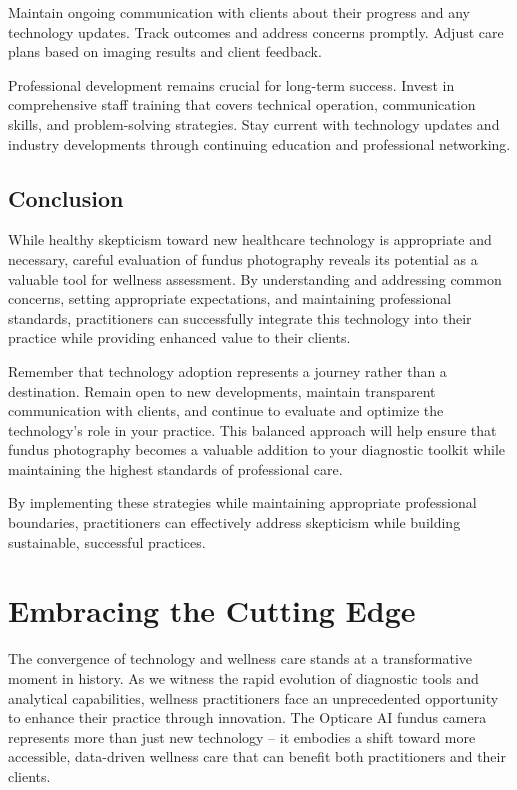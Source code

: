 \documentclass[
  Letterpaper,
]{scrbook}
\begin{document}
Maintain ongoing communication with clients about their progress and any
technology updates. Track outcomes and address concerns promptly. Adjust
care plans based on imaging results and client feedback.

Professional development remains crucial for long-term success. Invest
in comprehensive staff training that covers technical operation,
communication skills, and problem-solving strategies. Stay current with
technology updates and industry developments through continuing
education and professional networking.

\section{Conclusion}\label{conclusion-5}

While healthy skepticism toward new healthcare technology is appropriate
and necessary, careful evaluation of fundus photography reveals its
potential as a valuable tool for wellness assessment. By understanding
and addressing common concerns, setting appropriate expectations, and
maintaining professional standards, practitioners can successfully
integrate this technology into their practice while providing enhanced
value to their clients.

Remember that technology adoption represents a journey rather than a
destination. Remain open to new developments, maintain transparent
communication with clients, and continue to evaluate and optimize the
technology's role in your practice. This balanced approach will help
ensure that fundus photography becomes a valuable addition to your
diagnostic toolkit while maintaining the highest standards of
professional care.

By implementing these strategies while maintaining appropriate
professional boundaries, practitioners can effectively address
skepticism while building sustainable, successful practices.


\chapter{Embracing the Cutting Edge}\label{embracing-the-cutting-edge}

The convergence of technology and wellness care stands at a
transformative moment in history. As we witness the rapid evolution of
diagnostic tools and analytical capabilities, wellness practitioners
face an unprecedented opportunity to enhance their practice through
innovation. The Opticare AI fundus camera represents more than just new
technology -- it embodies a shift toward more accessible, data-driven
wellness care that can benefit both practitioners and their clients.
\end{document}
